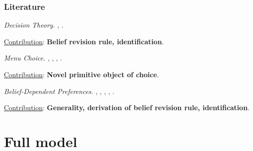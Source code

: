 \documentclass[usenames,dvipsnames,aspectratio=169,11pt,handout]{beamer}
\begin{document}
\begin{frame}\frametitle{Literature}

	\begin{wideitemize}
		\item \textit{Decision Theory.} \cite{liangInformationdependentExpectedUtility2017}, \cite{dillenbergerAdditivebeliefbasedPreferences2020} \cite{rommeswinkelPreferenceKnowledge2023}.

		\vspace{0.3cm}
		\underline{Contribution}: \textbf{Belief revision rule, identification}.
		\item \textit{Menu Choice.} \cite{gulTemptationSelfControl2001}, \cite{ozdenorenCompletingStateSpace2002}, \cite{epsteinAxiomaticModelNonBayesian2006}, \cite{epsteinColdFeet2007}.

		\vspace{0.3cm}
		\underline{Contribution}: \textbf{Novel primitive object of choice}.
		\item \textit{Belief-Dependent Preferences.} \cite{brunnermeierOptimalExpectations2005}, \cite{eliazCanAnticipatoryFeelings2006}, \cite{benabou2016mindful}, \cite{golmanInformationAvoidance2017}, \cite{battigalliBeliefdependentMotivationsPsychological2022}.

		\vspace{0.3cm}
		\underline{Contribution}: \textbf{Generality, derivation of belief revision rule, identification}.
	\end{wideitemize}

\end{frame}

\section{Full model}
\end{document}
